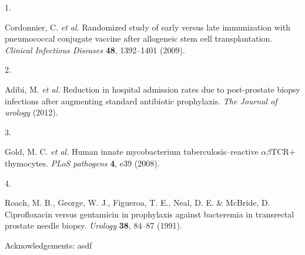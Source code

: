 \documentclass[
  letterpaper,
  DIV=11,
  numbers=noendperiod]{scrartcl}
\newlength{\cslhangindent}
\newlength{\csllabelwidth}
\newlength{\cslentryspacingunit} %
\newenvironment{CSLReferences}[2] %
 {%
  \setlength{\parindent}{0pt}
  \ifodd #1
  \let\oldpar\par
  \def\par{\hangindent=\cslhangindent\oldpar}
  \fi
  \setlength{\parskip}{#2\cslentryspacingunit}
 }%
 {}
\newcommand{\CSLLeftMargin}[1]{\parbox[t]{\csllabelwidth}{#1}}
\newcommand{\CSLRightInline}[1]{\parbox[t]{\linewidth - \csllabelwidth}{#1}\break}
\begin{document}
\hypertarget{refs}{}
\begin{CSLReferences}{0}{0}
\leavevmode{}%
\CSLLeftMargin{1. }%
\CSLRightInline{Cordonnier, C. \emph{et al.} Randomized study of early
versus late immunization with pneumococcal conjugate vaccine after
allogeneic stem cell transplantation. \emph{Clinical Infectious
Diseases} \textbf{48}, 1392--1401 (2009).}

\leavevmode{}%
\CSLLeftMargin{2. }%
\CSLRightInline{Adibi, M. \emph{et al.} Reduction in hospital admission
rates due to post-prostate biopsy infections after augmenting standard
antibiotic prophylaxis. \emph{The Journal of urology} (2012).}

\leavevmode{}%
\CSLLeftMargin{3. }%
\CSLRightInline{Gold, M. C. \emph{et al.} Human innate mycobacterium
tuberculosis--reactive \(\alpha\)\(\beta\)TCR+ thymocytes. \emph{PLoS
pathogens} \textbf{4}, e39 (2008).}

\leavevmode{}%
\CSLLeftMargin{4. }%
\CSLRightInline{Roach, M. B., George, W. J., Figueroa, T. E., Neal, D.
E. \& McBride, D. Ciprofloxacin versus gentamicin in prophylaxis against
bacteremia in transrectal prostate needle biopsy. \emph{Urology}
\textbf{38}, 84--87 (1991).}

\end{CSLReferences}

Acknowledgements: asdf
\end{document}
